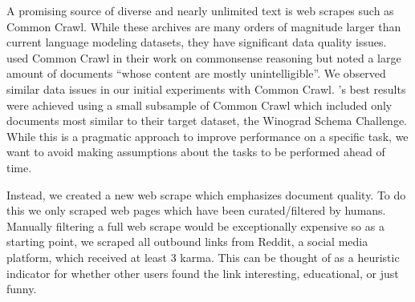 \documentclass{article}
\begin{document}
A promising source of diverse and nearly unlimited text is web scrapes such as Common Crawl. While these archives are many orders of magnitude larger than current language modeling datasets, they have significant data quality issues. \citet{trinh2018simple} used Common Crawl in their work on commonsense reasoning but noted a large amount of documents ``whose content are mostly unintelligible''. We observed similar data issues in our initial experiments with Common Crawl. \citet{trinh2018simple}'s best results were achieved using a small subsample of Common Crawl which included only documents most similar to their target dataset, the Winograd Schema Challenge. While this is a pragmatic approach to improve performance on a specific task, we want to avoid making assumptions about the tasks to be performed ahead of time.

Instead, we created a new web scrape which emphasizes document quality. To do this we only scraped web pages which have been curated/filtered by humans. Manually filtering a full web scrape would be exceptionally expensive so as a starting point, we scraped all outbound links from Reddit, a social media platform, which received at least 3 karma. This can be thought of as a heuristic indicator for whether other users found the link interesting, educational, or just funny.
\end{document}
